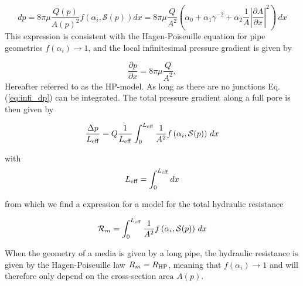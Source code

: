 \documentclass[draft]{agujournal2019}
\begin{document}
\begin{equation}
	dp = 8\pi \mu \frac{Q(p)}{A(p)^2} f\left(\alpha_i,\mathcal{S}(p) \right) dx= 8 \pi \mu\frac{Q}{A^2}\left(\alpha_0+\alpha_1\gamma^{-2} + \alpha_2 \frac{1}{A}\left|\frac{\partial A}{\partial x}\right|^2\right)\,dx\label{eq:infi_dp}
\end{equation}
This expression is consistent with the Hagen-Poiseuille equation for pipe geometries $f(\alpha_i)\rightarrow 1$, and the local infinitesimal pressure gradient is given by 

\begin{equation}
		\frac{\partial p}{\partial x} = 8 \pi \mu\frac{Q}{A^2}, \label{eq:HP}
\end{equation}
Hereafter referred to as the HP-model. As long as there are no junctions Eq.(\ref{eq:infi_dp}) can be integrated. The total pressure gradient along a full pore is then given by

\begin{equation}
	\frac{\Delta p}{L_{\rm{eff}}} =  Q \frac{1}{L_{\rm{eff}}}\int^{L_{\rm{eff}}}_{0}\frac{1}{A^2}f\left(\alpha_i,\mathcal{S}(p)\right)\,dx
\end{equation}

with 
\begin{equation}
	L_{\rm{eff}} = \int^{L_{\rm{eff}}}_{0} dx
\end{equation}

from which we find a expression for a model for the total hydraulic resistance 

\begin{equation}
	\mathcal{R}_m = \int^{L_{\rm{eff}}}_{0}\frac{1}{A^2}f\left(\alpha_i,\mathcal{S}(p)\right)\,dx\label{eq:R_model}
\end{equation}

When the geometry of a media is given by a long pipe, the hydraulic resistance is given by the Hagen-Poiseuille law $R_m = R_{\rm{HP}}$, meaning that $f(\alpha_i)\rightarrow 1$ and will therefore only depend on the cross-section area  $A(p)$.
\end{document}
